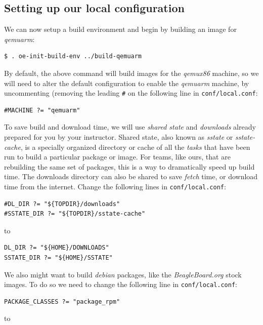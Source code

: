 \documentclass[a4paper,12pt,obeyspaces,spaces,hyphens]{article}
\begin{document}
\break
\subsection{Setting up our local configuration}

We can now setup a build environment and begin by building an image for {\em qemuarm}:

\begin{verbatim}
$ . oe-init-build-env ../build-qemuarm
\end{verbatim}

By default, the above command will build images for the {\em qemux86} machine, so we will need to alter the default configuration to enable the {\em qemuarm} machine, by uncommenting (removing the leading \texttt{\#} on the following line in \texttt{conf/local.conf}:

\begin{verbatim}
#MACHINE ?= "qemuarm"
\end{verbatim}

To save build and download time, we will use {\em shared state} and {\em downloads} already prepared for you by your instructor. Shared state, also known as {\em sstate} or {\em sstate-cache}, is a specially organized directory or cache of all the {\em tasks} that have been run to build a particular package or image. For teams, like ours, that are rebuilding the same set of packages, this is a way to dramatically speed up build time. The downloads directory can also be shared to save {\em fetch} time, or download time from the internet. Change the following lines in \texttt{conf/local.conf}:

\begin{verbatim}
#DL_DIR ?= "${TOPDIR}/downloads"
#SSTATE_DIR ?= "${TOPDIR}/sstate-cache"
\end{verbatim}

to

\begin{verbatim}
DL_DIR ?= "${HOME}/DOWNLOADS"
SSTATE_DIR ?= "${HOME}/SSTATE"
\end{verbatim}

We also might want to build {\em debian} packages, like the {\em BeagleBoard.org} stock images. To do so we need to change the following line in \texttt{conf/local.conf}:

\begin{verbatim}
PACKAGE_CLASSES ?= "package_rpm"
\end{verbatim}

to
\end{document}
